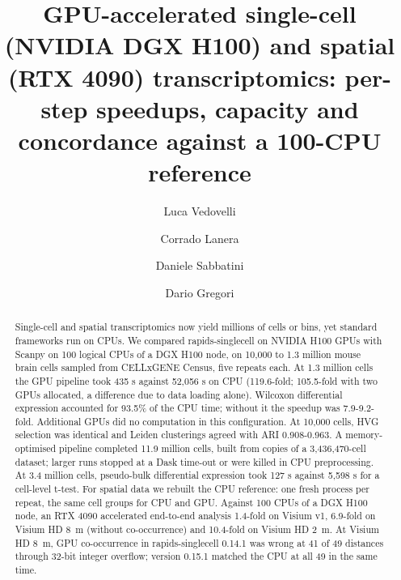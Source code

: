 \documentclass[runningheads]{llncs}
\begin{document}
\title{GPU-accelerated single-cell (NVIDIA DGX H100) and spatial (RTX 4090) transcriptomics: per-step speedups, capacity and concordance against a 100-CPU reference}
\author{Luca Vedovelli \and Corrado Lanera \and Daniele Sabbatini \and Dario Gregori}
\maketitle
\begin{abstract}
Single-cell and spatial transcriptomics now yield millions of cells or bins, yet standard frameworks run on CPUs. We compared rapids-singlecell on NVIDIA H100 GPUs with Scanpy on 100 logical CPUs of a DGX H100 node, on 10,000 to 1.3 million mouse brain cells sampled from CELLxGENE Census, five repeats each. At 1.3 million cells the GPU pipeline took 435 s against 52,056 s on CPU (119.6-fold; 105.5-fold with two GPUs allocated, a difference due to data loading alone). Wilcoxon differential expression accounted for 93.5\% of the CPU time; without it the speedup was 7.9-9.2-fold. Additional GPUs did no computation in this configuration. At 10,000 cells, HVG selection was identical and Leiden clusterings agreed with ARI 0.908-0.963. A memory-optimised pipeline completed 11.9 million cells, built from copies of a 3,436,470-cell dataset; larger runs stopped at a Dask time-out or were killed in CPU preprocessing. At 3.4 million cells, pseudo-bulk differential expression took 127 s against 5,598 s for a cell-level t-test. For spatial data we rebuilt the CPU reference: one fresh process per repeat, the same cell groups for CPU and GPU. Against 100 CPUs of a DGX H100 node, an RTX 4090 accelerated end-to-end analysis 1.4-fold on Visium v1, 6.9-fold on Visium HD 8~\textmu{}m (without co-occurrence) and 10.4-fold on Visium HD 2~\textmu{}m. At Visium HD 8~\textmu{}m, GPU co-occurrence in rapids-singlecell 0.14.1 was wrong at 41 of 49 distances through 32-bit integer overflow; version 0.15.1 matched the CPU at all 49 in the same time.
\end{abstract}
\end{document}
